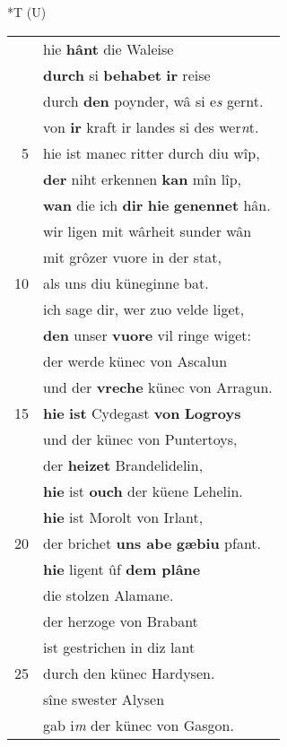 \documentclass[8pt,a4paper,notitlepage]{article}
\begin{document}
\begin{table}[ht]
\begin{minipage}[t]{0.5\linewidth}
\end{minipage}
\hspace{0.5cm}
\begin{minipage}[t]{0.5\linewidth}
\small
\begin{center}*T (U)
\end{center}
\begin{tabular}{rl}
 & hie \textbf{hânt} die Waleise\\ 
 & \textbf{durch} si \textbf{behabet} \textbf{ir} reise\\ 
 & durch \textbf{den} poynder, wâ si e\textit{s} gernt.\\ 
 & von \textbf{ir} kraft ir landes si des wer\textit{n}t.\\ 
5 & hie ist manec ritter durch diu wîp,\\ 
 & \textbf{der} niht erkennen \textbf{kan} mîn lîp,\\ 
 & \textbf{wan} die ich \textbf{dir} \textbf{hie} \textbf{genennet} hân.\\ 
 & wir ligen mit wârheit sunder wân\\ 
 & mit grôzer vuore in der stat,\\ 
10 & als uns diu küneginne bat.\\ 
 & ich sage dir, wer zuo velde liget,\\ 
 & \textbf{den} unser \textbf{vuore} vil ringe wiget:\\ 
 & der werde künec von Ascalun\\ 
 & und der \textbf{vreche} künec von Arragun.\\ 
15 & \textbf{hie} \textbf{ist} Cydegast \textbf{von} \textbf{Logroys}\\ 
 & und der künec von Puntertoys,\\ 
 & der \textbf{heizet} Brandelidelin,\\ 
 & \textbf{hie} ist \textbf{ouch} der küene Lehelin.\\ 
 & \textbf{hie} ist Morolt von Irlant,\\ 
20 & der brichet \textbf{uns abe} \textbf{gæbiu} pfant.\\ 
 & \textbf{hie} ligent ûf \textbf{dem plâne}\\ 
 & die stolzen Alamane.\\ 
 & der herzoge von Brabant\\ 
 & ist gestrichen in diz lant\\ 
25 & durch den künec Hardysen.\\ 
 & sîne swester Alysen\\ 
 & gab i\textit{m} der künec von Gasgon.\\ 

\end{tabular}
\end{minipage}
\end{table}
\end{document}
